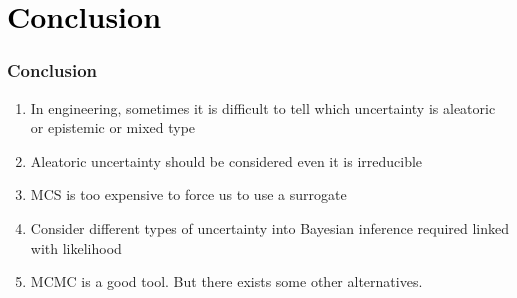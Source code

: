 \section{\textcolor{black}{Conclusion}}
\begin{frame}
\frametitle{Conclusion}

\begin{enumerate}
\setlength\itemsep{1em}
    \item In engineering, sometimes it is difficult to tell which uncertainty is \alert{aleatoric} or \alert{epistemic} or \alert{mixed type}

    \item \alert{Aleatoric} uncertainty should be considered even it is \alert{irreducible}

    \item MCS is too expensive to force us to use a \alert{surrogate}

    \item Consider different types of uncertainty into Bayesian inference required \alert{linked with likelihood}

    \item MCMC is a good tool. But there exists some other alternatives.  
\end{enumerate}

    
\end{frame}





